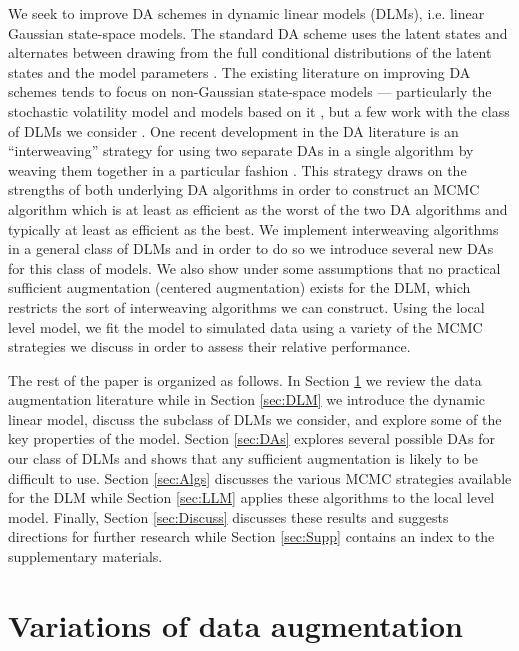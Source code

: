 \documentclass[12pt]{article}
\begin{document}
We seek to improve DA schemes in dynamic linear models (DLMs), i.e. linear Gaussian state-space models. The standard DA scheme uses the latent states and alternates between drawing from the full conditional distributions of the latent states and the model parameters \citep{fruhwirth1994data,carter1994gibbs}. The existing literature on improving DA schemes tends to focus on non-Gaussian state-space models --- particularly the stochastic volatility model and models based on it \citep{shephard1996statistical,fruhwirth2003bayesian,roberts2004bayesian,bos2006inference,strickland2008parameterisation,fruhwirth2008heston,kastner2013ancillarity}, but a few work with the class of DLMs we consider \citep{fruhwirth2004efficient}. One recent development in the DA literature is an ``interweaving'' strategy for using two separate DAs in a single algorithm by weaving them together in a particular fashion \citep{yu2011center}. This strategy draws on the strengths of both underlying DA algorithms in order to construct an MCMC algorithm which is at least as efficient as the worst of the two DA algorithms and typically at least as efficient as the best. We implement interweaving algorithms in a general class of DLMs and in order to do so we introduce several new DAs for this class of models. We also show under some assumptions that no practical sufficient augmentation (centered augmentation) exists for the DLM, which restricts the sort of interweaving algorithms we can construct. Using the local level model, we fit the model to simulated data using a variety of the MCMC strategies we discuss in order to assess their relative performance.

The rest of the paper is organized as follows. In Section \ref{sec:DA} we review the data augmentation literature while in Section \ref{sec:DLM} we introduce the dynamic linear model, discuss the subclass of DLMs we consider, and explore some of the key properties of the model. Section \ref{sec:DAs} explores several possible DAs for our class of DLMs and shows that any sufficient augmentation is likely to be difficult to use. Section \ref{sec:Algs} discusses the various MCMC strategies available for the DLM while Section \ref{sec:LLM} applies these algorithms to the local level model. Finally, Section \ref{sec:Discuss} discusses these results and suggests directions for further research while Section \ref{sec:Supp} contains an index to the supplementary materials.

\section{Variations of data augmentation}\label{sec:DA}
\end{document}
